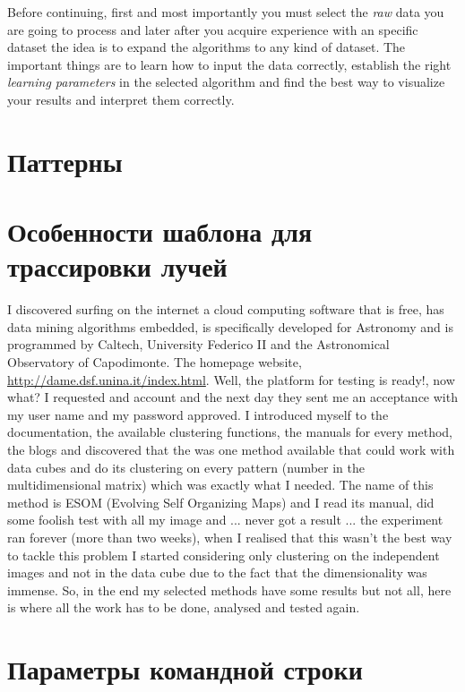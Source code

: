 \documentclass[11pt,fleqn,english,russian]{report} %
\begin{document}
Before continuing, first and most importantly you must select the \emph{raw} data you are going to process and later after you acquire experience with an specific dataset the idea is to expand the algorithms to any kind of dataset. The important things are to learn how to input the data correctly, establish the right \emph{learning parameters} in the selected algorithm and find the best way to visualize your results and interpret them correctly.

\chapter{Паттерны}\label{patterns}

\chapter{Особенности шаблона для трассировки лучей}

I discovered surfing on the internet a cloud computing software that is free, has data mining algorithms embedded, is specifically developed for Astronomy and is programmed by Caltech, University Federico II and the Astronomical Observatory of Capodimonte. The homepage website, \url{http://dame.dsf.unina.it/index.html}. Well, the platform for testing is ready!, now what? I requested and account and the next day they sent me an acceptance with my user name and my password approved.
I introduced myself to the documentation, the available clustering functions, the manuals for every method, the blogs and discovered that the was one method available that could work with data cubes and do its clustering on every pattern (number in the multidimensional matrix) which was exactly what I needed. The name of this method is ESOM (Evolving Self Organizing Maps) and I read its manual, did some foolish test with all my image and ... never got a result ... the experiment ran forever (more than two weeks), when I realised that this wasn't the best way to tackle this problem I started considering only clustering on the independent images and not in the data cube due to the fact that the dimensionality was immense. So, in the end my selected methods have some results but not all, here is where all the work has to be done, analysed and tested again.

\chapter{Параметры командной строки}
\end{document}
